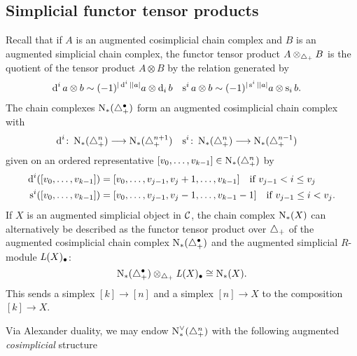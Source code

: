 

\subsection{Simplicial functor tensor products}
Recall that if $A$ is an augmented cosimplicial chain complex and $B$ is an augmented simplicial chain complex, the functor tensor product $A\otimes_{\triangle_{+}} B$ is the quotient of the tensor product $A\otimes B$ by the relation generated by
\begin{align*}
	\operatorname{d}^i a\otimes b &\sim (-1)^{|\operatorname{d}^i||a|}a\otimes \operatorname{d}_i b
	&
	\operatorname{s}^ia\otimes b &\sim (-1)^{|\operatorname{s}^i||a|}a\otimes \operatorname{s}_ib.
\end{align*}
The chain complexes $\operatorname{N}_{*}(\triangle_{+}^\bullet)$ form an augmented cosimplicial chain complex with
\begin{align*}
	\operatorname{d}^i\colon \operatorname{N}_{*}(\triangle_{+}^n)&\longrightarrow \operatorname{N}_{*}(\triangle_{+}^{n+1})
	&
	\operatorname{s}^i\colon \operatorname{N}_{*}(\triangle_{+}^{n})&\longrightarrow \operatorname{N}_{*}(\triangle_{+}^{n-1})
\end{align*}
given on an ordered representative $[v_0,\ldots,v_{k-1}]\in \operatorname{N}_{*}(\triangle_{+}^n)$ by
\begin{align*}
\operatorname{d}^i([v_0,\ldots,v_{k-1}]) &= [v_0,\ldots,v_{j-1},v_j+1,\ldots,v_{k-1}] \quad \text{if $v_{j-1}<i\leq v_j$}
\\
\operatorname{s}^i([v_0,\ldots,v_{k-1}]) &= [v_0,\ldots,v_{j-1},v_j-1,\ldots,v_{k-1}-1] \quad \text{if $v_{j-1} \leq i < v_j$}.
\end{align*}
If $X$ is an augmented simplicial object in $\mathcal{C}$, the chain complex $\operatorname{N}_{*}(X)$ can alternatively be described as the functor tensor product over $\triangle_{+}$ of the augmented cosimplicial chain complex $\operatorname{N}_{*}(\triangle_{+}^{\bullet})$ and the augmented simplicial $R$-module $\operatorname{{\it L}}(X)_\bullet$:
\begin{equation}\label{eq:1}
	\operatorname{N}_{*}(\triangle_{+}^\bullet)\otimes_{\triangle_{+}} \operatorname{{\it L}}(X)_\bullet \cong \operatorname{N}_{*}(X).
\end{equation}
This sends a simplex $[k]\to [n]$ and a simplex $[n]\to X$ to the composition $[k]\to X$.

Via Alexander duality, we may endow $\operatorname{N}^\vee_{*}(\triangle_{+}^n)$ with the following augmented \emph{cosimplicial} structure


